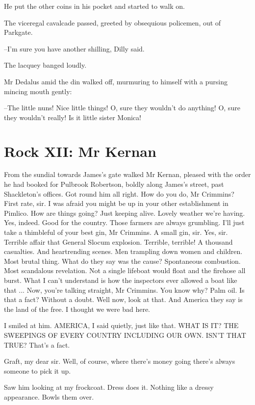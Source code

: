 He put the other coins in his pocket and started to walk on.

The viceregal cavalcade passed,
greeted by obsequious policemen,
out of Parkgate.%

--I'm sure you have another shilling,
Dilly said.

The lacquey banged loudly.

Mr Dedalus amid the din walked off,
murmuring to himself with a
pursing mincing mouth gently:

--The little nuns!
Nice little things!
O, sure they wouldn't do anything!
O, sure they wouldn't really!
Is it little sister Monica!


\section*{Rock XII: Mr Kernan}


From the sundial
towards James's gate
walked Mr Kernan,
pleased with the order he had booked for Pulbrook Robertson,
boldly along James's street,
past Shackleton's offices.
Got round him all right.
How do you do, Mr Crimmins?
First rate, sir.
I was afraid you might be up in your other establishment in Pimlico.
How are things going?
Just keeping alive.
Lovely weather we're having.
Yes, indeed.
Good for the country.
Those farmers are always grumbling.
I'll just take a thimbleful of your best gin, Mr Crimmins.
A small gin, sir.
Yes, sir.
Terrible affair that
General Slocum explosion.
Terrible, terrible!
A thousand casualties.
And heartrending scenes.
Men trampling down women and children.
Most brutal thing.
What do they say was the cause?
Spontaneous combustion.
Most scandalous revelation.
Not a single lifeboat would float and the firehose all burst.
What I can't understand
is how the inspectors ever allowed a boat like that ...
Now, you're talking straight, Mr Crimmins.
You know why?
Palm oil.
Is that a fact?
Without a doubt.
Well now, look at that.
And America they say is the land of the free.
I thought we were bad here.

I smiled at him.
AMERICA,
I said quietly,
just like that.
WHAT IS IT?
THE
SWEEPINGS OF EVERY COUNTRY INCLUDING OUR OWN.
ISN'T THAT TRUE?
That's a
fact.

Graft,
my dear sir.
Well, of course, where there's money going
there's
always someone to pick it up.

Saw him looking at my frockcoat.
Dress does it.
Nothing like a dressy
appearance.
Bowls them over.

